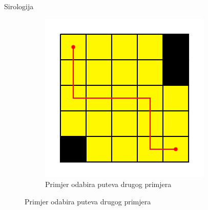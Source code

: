 \begin{statement}[
  problempoints=100,
  timelimit=1 sekunda,
  memorylimit=1024 MiB,
]{Sirologija}
\begin{figure}[!h]
\begin{subfigure}{0.49\linewidth}
    \end{subfigure}
    \begin{subfigure}{0.49\linewidth}
      \centering
      \includegraphics[width=\linewidth]{pic/sir2.png}
      \caption{Primjer odabira puteva drugog primjera}

    \end{subfigure}

  \end{figure}
  
\end{statement}

